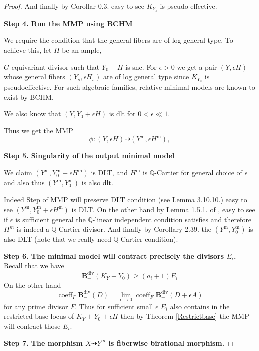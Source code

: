 \documentclass[11pt]{article}
\theoremstyle{definition}
\begin{document}
\begin{proof}
		And finally by \cite{BDPP} Corollar 0.3. easy to see $K_{Y_s}$ is pseudo-effective.
		
		\textbf{Step 4. Run the MMP using BCHM}
		
		We require the condition that the general fibers are of log general type. To achieve this, let $H$ be an ample,
		
		$G$-equivariant divisor such that $Y_0+H$ is snc. For $\epsilon>0$ we get a pair $(Y, \epsilon H)$ whose general fibers $\left(Y_s, \epsilon H_s\right)$ are of log general type since $K_{Y_s}$ is pseudoeffective. For such algebraic families, relative minimal models are known to exist by BCHM. 
		
		We also know that $\left(Y, Y_0+\epsilon H\right)$ is dlt for $0<\epsilon \ll 1$.  
		
		Thus we get the MMP $$\phi:(Y, \epsilon H) \dashrightarrow\left(Y^{\mathrm{m}}, \epsilon H^{\mathrm{m}}\right),$$
		
		\textbf{Step 5. Singularity of the output minimal model}
		
		We claim $\left(Y^{\mathrm{m}}, Y_0^{\mathrm{m}}+\epsilon H^{\mathrm{m}}\right)$ is DLT, and $H^{\mathrm{m}}$ is $\mathbb{Q}$-Cartier for general choice of $\epsilon$ and also thus $\left(Y^{\mathrm{m}}, Y_0^{\mathrm{m}}\right)$ is also dlt.
		
		Indeed Step of MMP will preserve DLT condition (see \cite{BCHM} Lemma 3.10.10.) easy to see $\left(Y^{\mathrm{m}}, Y_0^{\mathrm{m}}+\epsilon H^{\mathrm{m}}\right)$ is DLT. On the other hand by Lemma 1.5.1. of \cite{Alex}, easy to see if $\epsilon$ is sufficient general the $\mathbb{Q}$-linear independent condition satisfies and therefore $H^m$ is indeed a $\mathbb{Q}$-Cartier divisor. And finally by \cite{KollarMori} Corollary 2.39. the $\left(Y^{\mathrm{m}}, Y_0^{\mathrm{m}}\right)$ is also DLT (note that we really need $\mathbb{Q}$-Cartier condition). 
		 
		\textbf{Step 6. The minimal model will contract precisely the divisors $E_i$.}
		Recall that we have $$\mathbf{B}_-^{\operatorname{div}}(K_Y + Y_0) \ge (a_i+1) E_i$$
		On the other hand $$\operatorname{coeff}_F \mathbf{B}_{-}^{\mathrm{div}}(D)=\lim _{\epsilon \rightarrow 0} \operatorname{coeff}_F \mathbf{B}_{-}^{\mathrm{div}}(D+\epsilon A)$$for any prime divisor $F$. Thus for sufficient small $\epsilon$ $E_i$ also contains in the restricted base locus of $K_Y+Y_0+\epsilon H$ then by Theorem \ref{Restrictbase} the MMP will contract those $E_i$.
		
		\textbf{Step 7. The morphism $X \dashrightarrow Y^m$ is fiberwise birational morphism.}
		

\end{proof}
\end{document}
